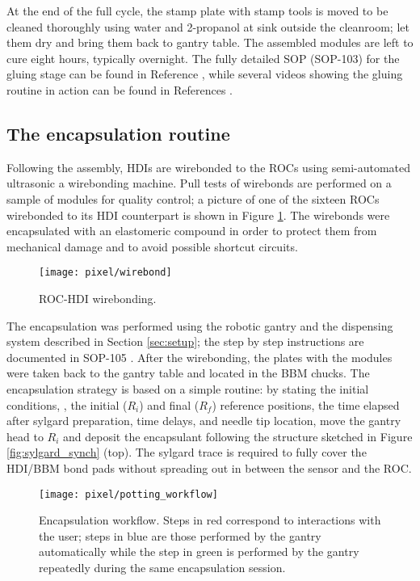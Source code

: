 At the end of the full cycle, the stamp plate with stamp tools is moved to be cleaned thoroughly using water and 2-propanol at sink outside the cleanroom; let them dry and bring them back to gantry table. The assembled modules are left to cure eight hours, typically overnight. The fully detailed SOP (SOP-103) for the gluing stage can be found in Reference \cite{sop_103}, while several videos showing the gluing routine in action can be found in References \cite{gluing_frank, jmonroy_channel}. 

\subsection{The encapsulation routine}

Following the assembly, HDIs are wirebonded to the ROCs using semi-automated ultrasonic a wirebonding machine. Pull tests of wirebonds are performed on a sample of modules for quality control; a picture of one of the sixteen ROCs wirebonded to its HDI counterpart is shown in Figure \ref{fig:wirebonds}. The wirebonds were encapsulated with an elastomeric compound in order to protect them from mechanical damage and to avoid possible shortcut circuits.

\begin{figure}[h]
\begin{center}
  \texttt{[image: pixel/wirebond]}
 \caption[ROC-HDI wirebonding.]{ROC-HDI wirebonding.}\label{fig:wirebonds}
\end{center}
\end{figure}

The encapsulation was performed using the robotic gantry and the dispensing system described in Section \ref{sec:setup}; the step by step instructions are documented in SOP-105 \cite{sop_105}. After the wirebonding, the plates with the modules were taken back to the gantry table and located in the BBM chucks. The encapsulation strategy is based on a simple routine: by stating the initial conditions, \ie, the initial ($R_i$) and final ($R_f$) reference positions, the time elapsed after sylgard preparation, time delays, and needle tip location, move the gantry head to $R_i$ and deposit the encapsulant following the structure sketched in Figure \ref{fig:sylgard_synch} (top). The sylgard trace is required to fully cover the HDI/BBM bond pads without spreading out in between the sensor and the ROC.

\begin{figure}[h]
\begin{center}
  \texttt{[image: pixel/potting\_workflow]}
  \caption[Encapsulation workflow.]{Encapsulation workflow. Steps in red correspond to interactions with the user; steps in blue are those performed by the gantry automatically while the step in green is performed by the gantry repeatedly during the same encapsulation session.}\label{fig:potting_workflow}
\end{center}
\end{figure}

